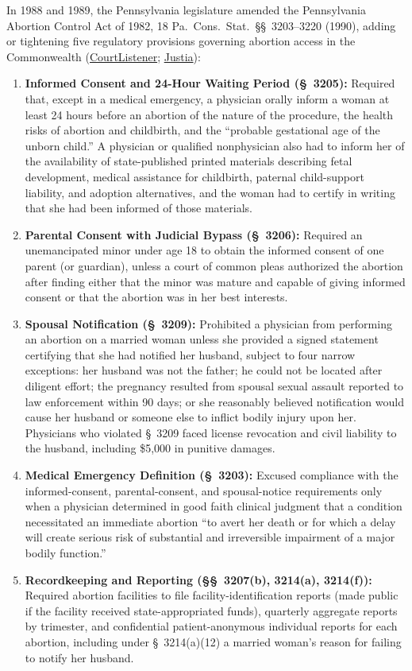 \documentclass[12pt]{article}
\begin{document}
In 1988 and 1989, the Pennsylvania legislature amended the Pennsylvania Abortion Control Act of 1982, 18 Pa.\ Cons.\ Stat.\ \S\S\ 3203--3220 (1990), adding or tightening five regulatory provisions governing abortion access in the Commonwealth (\href{https://www.courtlistener.com/opinion/112786/planned-parenthood-of-southeastern-pa-v-casey/}{CourtListener}; \href{https://supreme.justia.com/cases/federal/us/505/833/}{Justia}):
\begin{enumerate}
\item \textbf{Informed Consent and 24-Hour Waiting Period (\S\ 3205):} Required that, except in a medical emergency, a physician orally inform a woman at least 24 hours before an abortion of the nature of the procedure, the health risks of abortion and childbirth, and the ``probable gestational age of the unborn child.'' A physician or qualified nonphysician also had to inform her of the availability of state-published printed materials describing fetal development, medical assistance for childbirth, paternal child-support liability, and adoption alternatives, and the woman had to certify in writing that she had been informed of those materials.
\item \textbf{Parental Consent with Judicial Bypass (\S\ 3206):} Required an unemancipated minor under age 18 to obtain the informed consent of one parent (or guardian), unless a court of common pleas authorized the abortion after finding either that the minor was mature and capable of giving informed consent or that the abortion was in her best interests.
\item \textbf{Spousal Notification (\S\ 3209):} Prohibited a physician from performing an abortion on a married woman unless she provided a signed statement certifying that she had notified her husband, subject to four narrow exceptions: her husband was not the father; he could not be located after diligent effort; the pregnancy resulted from spousal sexual assault reported to law enforcement within 90 days; or she reasonably believed notification would cause her husband or someone else to inflict bodily injury upon her. Physicians who violated \S\ 3209 faced license revocation and civil liability to the husband, including \$5,000 in punitive damages.
\item \textbf{Medical Emergency Definition (\S\ 3203):} Excused compliance with the informed-consent, parental-consent, and spousal-notice requirements only when a physician determined in good faith clinical judgment that a condition necessitated an immediate abortion ``to avert her death or for which a delay will create serious risk of substantial and irreversible impairment of a major bodily function.''
\item \textbf{Recordkeeping and Reporting (\S\S\ 3207(b), 3214(a), 3214(f)):} Required abortion facilities to file facility-identification reports (made public if the facility received state-appropriated funds), quarterly aggregate reports by trimester, and confidential patient-anonymous individual reports for each abortion, including under \S\ 3214(a)(12) a married woman's reason for failing to notify her husband.
\end{enumerate}
\end{document}
